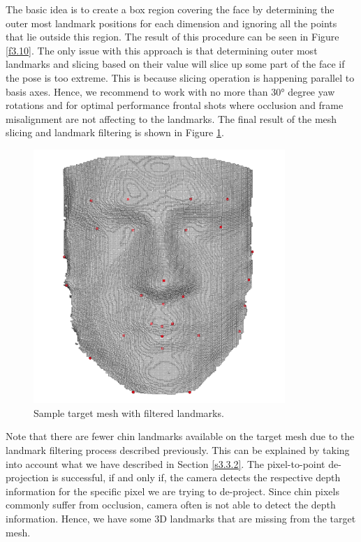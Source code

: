 The basic idea is to create a box region covering the face by determining the outer most landmark positions for each dimension and ignoring all the points that lie outside this region. The result of this procedure can be seen in Figure \ref{f3.10}. The only issue with this approach is that determining outer most landmarks and slicing based on their value will slice up some part of the face if the pose is too extreme. This is because slicing operation is happening parallel to basis axes. Hence, we recommend to work with no more than $\ang{30}$ degree yaw rotations and for optimal performance frontal shots where occlusion and frame misalignment are not affecting to the landmarks. The final result of the mesh slicing and landmark filtering is shown in Figure \ref{f3.11}. 

\begin{figure}
  \centering
  \includegraphics[width=0.85\textwidth]{Figures/Pictures/targetMeshWithLandmarks_t.png}
  \caption{Sample target mesh with filtered landmarks.}
  \label{f3.11}
\end{figure}

Note that there are fewer chin landmarks available on the target mesh due to the landmark filtering process described previously. This can be explained by taking into account what we have described in Section \ref{s3.3.2}. The pixel-to-point de-projection is successful, if and only if, the camera detects the respective depth information for the specific pixel we are trying to de-project. Since chin pixels commonly suffer from occlusion, camera often is not able to detect the depth information. Hence, we have some 3D landmarks that are missing from the target mesh.   

